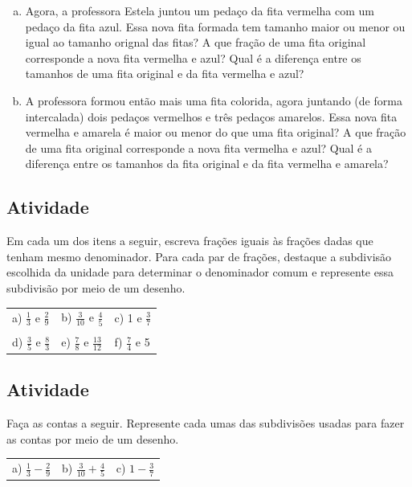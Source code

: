 \begin{enumerate}[a)]
  \item  Agora, a professora Estela juntou um pedaço da fita vermelha com um pedaço da fita azul. Essa nova fita formada tem tamanho maior ou menor ou igual ao tamanho orignal das fitas? A que fração de uma fita original corresponde a nova fita vermelha e azul? Qual é a diferença entre os tamanhos de uma fita original e da fita vermelha e azul?
  \item  A professora formou então mais uma fita colorida, agora juntando (de forma intercalada) dois pedaços vermelhos e três pedaços amarelos. Essa nova fita vermelha e amarela é maior ou menor do que uma fita original? A que fração de uma fita original corresponde a nova fita vermelha e azul? Qual é a diferença entre os tamanhos da fita original e da fita vermelha e amarela?
\end{enumerate}


\subsection{Atividade}


Em cada um dos itens a seguir, escreva frações iguais às frações dadas que tenham mesmo denominador. Para cada par de frações, destaque a subdivisão escolhida da unidade para determinar o denominador comum e represente essa subdivisão por meio de um desenho.

\begin{center}
  \begin{tabular}{m{}m{}m{}}
    
     a) $\frac{1}{3}$ e $\frac{2}{9}$  &   b) $\frac{3}{10}$ e $\frac{4}{5}$  &   c) 1 e $\frac{3}{7}$  \\
     \\
     d) $\frac{3}{5}$ e $\frac{8}{3}$  &   e) $\frac{7}{8}$ e $\frac{13}{12}$  &  f) $\frac{7}{4}$ e 5     
  \end{tabular}
\end{center}

\subsection{Atividade}

Faça as contas a seguir. Represente cada umas das subdivisões usadas para fazer as contas por meio de um desenho.

\begin{center}
  \begin{tabular}{m{}m{}m{}}    
     a) $\frac{1}{3} - \frac{2}{9}$  &   b) $\frac{3}{10} + \frac{4}{5}$  &   c) $1 - \frac{3}{7}$     
  \end{tabular}
\end{center}

